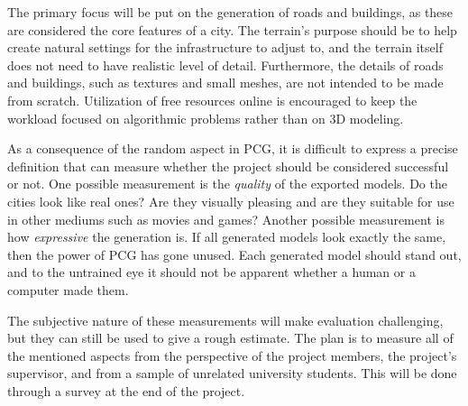 The primary focus will be put on the generation of roads and buildings, as these are considered the core features of a city.
The terrain's purpose should be to help create natural settings for the infrastructure to adjust to, and the terrain itself does not need to have realistic level of detail.
Furthermore, the details of roads and buildings, such as textures and small meshes, are not intended to be made from scratch.
Utilization of free resources online is encouraged to keep the workload focused on algorithmic problems rather than on 3D modeling.

As a consequence of the random aspect in PCG, it is difficult to express a precise definition that can measure whether the project should be considered successful or not.
One possible measurement is the \textit{quality} of the exported models.
Do the cities look like real ones?
Are they visually pleasing and are they suitable for use in other mediums such as movies and games?
Another possible measurement is how \textit{expressive} the generation is.
If all generated models look exactly the same, then the power of PCG has gone unused.
Each generated model should stand out, and to the untrained eye it should not be apparent whether a human or a computer made them.

The subjective nature of these measurements will make evaluation challenging, but they can still be used to give a rough estimate.
The plan is to measure all of the mentioned aspects from the perspective of the project members, the project's supervisor, and from a sample of unrelated university students.
This will be done through a survey at the end of the project.

